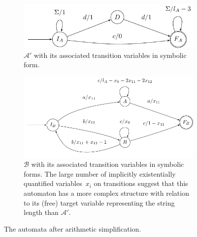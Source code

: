 \begin{figure}[ht]
  \centering 
\begin{subfigure}{0.42\textwidth}
  \centering
  \includegraphics[width=\textwidth]{a_annotated}
  \vspace*{5ex}
  \caption{ $\mathcal{A}'$ with its associated transition variables in symbolic
  form.}\label{fig:aut_a_annotated}
  \vspace*{1.9ex}
\end{subfigure}\hfill%
\begin{subfigure}{0.54\textwidth}
  \centering
  \includegraphics[width=\textwidth]{b_annotated}
  \caption{$\mathcal{B}$ with its associated transition variables in symbolic forms.
  The large number of implicitly existentially quantified
  variables~$x_i$ on
  transitions suggest that this automaton has a more complex structure
  with relation to its (free) target variable representing the string length
  than $\mathcal{A}'$. %
}\label{fig:aut_b_annotated}
\end{subfigure}
\caption{The automata after arithmetic simplification.}\label{fig:propagated}
\end{figure}

